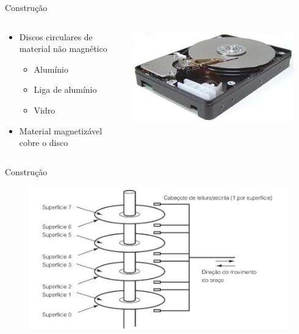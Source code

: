 \documentclass[aspectratio=169,
				xcolor=table]{beamer}
\begin{document}
	\begin{frame}{Construção}
		\begin{columns}
			\begin{column}{0.6\textwidth}
			\begin{itemize}
				\item Discos circulares de material não magnético
				\begin{itemize}
					\item Alumínio
					\item Liga de alumínio
					\item Vidro
				\end{itemize}

				\vspace{1em}
				\item Material magnetizável cobre o disco

			\end{itemize}
			
			\end{column}
			\begin{column}{0.4\textwidth}
							\includegraphics[width=0.9\textwidth, keepaspectratio]{../figs/cap08/hd02.png}

			\end{column}
		\end{columns}
	\end{frame}
	
	\begin{frame}{Construção}
		\begin{figure}
		\centering
		\includegraphics[height=0.8\textheight, keepaspectratio]{../figs/cap08/hd03.png}
		\end{figure}			
	\end{frame}
	
\end{document}
